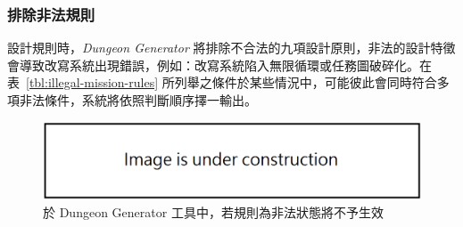 

\subsubsection{排除非法規則}
\label{sssec:method-missiongrammars-rules-illegals}

設計規則時，\textit{Dungeon Generator} 將排除不合法的九項設計原則，非法的設計特徵會導致改寫系統出現錯誤，例如：改寫系統陷入無限循環或任務圖破碎化。在表~\ref{tbl:illegal-mission-rules} 所列舉之條件於某些情況中，可能彼此會同時符合多項非法條件，系統將依照判斷順序擇一輸出。

\begin{figure}[!htb]
  \begin{center}
    \includegraphics[width=1.0\textwidth]{figures/under_construction.png}
    \caption{於 Dungeon Generator 工具中，若規則為非法狀態將不予生效}
    \label{fig:missiongrammars-illegal-rules}
  \end{center}
\end{figure}

